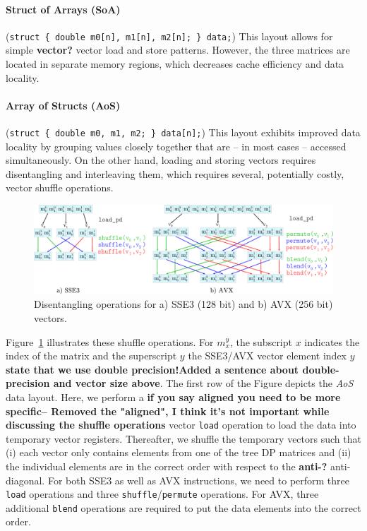 \documentclass[runningheads,a4paper]{llncs}
\begin{document}
\paragraph*{Struct of Arrays (SoA)} ({\small\texttt{struct \{ double m0[n], m1[n], m2[n]; \} data;}}) 
This layout allows for simple {\bf vector?} vector load and store patterns. 
However, the three matrices are located in separate memory regions, which decreases
cache efficiency and data locality.

\paragraph*{Array of Structs (AoS)} ({\small\texttt{struct \{ double m0, m1, m2; \}
data[n];}}) This layout exhibits improved data locality by grouping values
closely together that are -- in most cases -- accessed simultaneously. On the
other hand, loading and storing vectors requires disentangling and interleaving
them, which requires several, potentially costly, vector shuffle operations. 

\begin{figure}[ht!]
  \centering
  \includegraphics[scale=0.6]{figures/shuffle.pdf}
  \caption{Disentangling operations for a) SSE3 (128 bit) and b) AVX (256 bit) vectors.}
  \label{fig:shufflesse}
\end{figure}

Figure~\ref{fig:shufflesse} illustrates these shuffle operations. 
For $m_x^y$, the subscript $x$ indicates
the index of the matrix and the superscript $y$ the SSE3/AVX vector element
index $y$ {\bf state that we use double precision!}{\bf Added a sentence about
double-precision and vector size above}.  The first row of the Figure depicts the {\em AoS} data layout. 
Here, we perform a {\bf if you say aligned you need to be more
specific}{\bf -- Removed the "aligned", I think it's not important while discussing
the shuffle operations} vector \texttt{load} operation
to load the data into temporary vector registers. 
Thereafter, we shuffle the temporary vectors such that (i) each vector only contains elements from one of the tree DP matrices and 
(ii) the individual elements are in the correct order with respect to  the {\bf
anti-?} anti-diagonal. 
For both SSE3 as well as AVX instructions, we need to perform three \texttt{load} operations and three \texttt{shuffle}/\texttt{permute} operations. 
For AVX, three additional \texttt{blend} operations are required to put the data elements into the correct order. 
\end{document}
